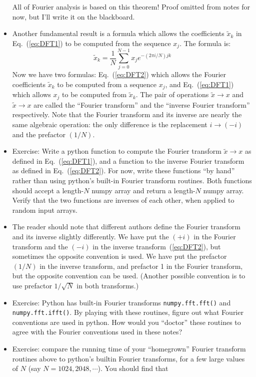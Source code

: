 \documentclass[aps,prd,superscriptaddress,groupedaddress,nofootinbib,nobibnotes]{revtex4}
\newcommand{\be}{\begin{equation}}
\newcommand{\ee}{\end{equation}}
\def\tx{{\tilde x}}
\begin{document}
\begin{itemize}
 All of Fourier analysis is based on this theorem!  Proof omitted from notes for now, but I'll
 write it on the blackboard.
\item Another fundamental result is a formula which allows the coefficients $\tx_k$ in Eq.~(\ref{eq:DFT1})
 to be computed from the sequence $x_j$.  The formula is:
\be
  \tx_k = \frac{1}{N} \sum_{j=0}^{N-1} x_j e^{-(2\pi i / N) j k}  \label{eq:DFT2}
\ee
 Now we have two formulas: Eq.~(\ref{eq:DFT2}) which allows the Fourier coefficients $\tx_k$ to be
 computed from a sequence $x_j$, and Eq.~(\ref{eq:DFT1}) which allows $x_j$ to be computed from $\tx_k$.
 The pair of operations $\tx \rightarrow x$ and $\tx \rightarrow x$ are called the ``Fourier transform''
 and the ``inverse Fourier transform'' respectively.
 Note that the Fourier transform and its inverse are nearly the same algebraic operation: 
 the only difference is the replacement $i \rightarrow (-i)$ and the prefactor $(1/N)$.
\item Exercise: Write a python function to compute the Fourier transform $\tx \rightarrow x$ as defined in Eq.~(\ref{eq:DFT1}),
 and a function to the inverse Fourier transform as defined in Eq.~(\ref{eq:DFT2}).  For now, write these functions
 ``by hand'' rather than using python's built-in Fourier transform routines.  Both functions should accept
 a length-$N$ numpy array and return a length-$N$ numpy array.  Verify that the two functions are inverses of each
 other, when applied to random input arrays.
\item The reader should note that different authors define the Fourier transform and its inverse slightly differently.
 We have put the $(+i)$ in the Fourier transform and the $(-i)$ in the inverse transform~(\ref{eq:DFT2}),
 but sometimes the opposite convention is used.  We have put the prefactor $(1/N)$ in the inverse transform,
 and prefactor 1 in the Fourier transform, but the opposite convention can be used.  (Another possible convention is
 to use prefactor $1/\sqrt{N}$ in both transforms.)
\item Exercise: Python has built-in Fourier transforms {\tt numpy.fft.fft()} and {\tt numpy.fft.ifft()}.
 By playing with these routines, figure out what Fourier conventions are used in python.
 How would you ``doctor'' these routines to agree with the Fourier conventions used in these notes?
\item Exercise: compare the running time of your ``homegrown'' Fourier transform routines above to python's
 builtin Fourier transforms, for a few large values of $N$ (say $N=1024, 2048, \cdots$).  You should find that

\end{itemize}
\end{document}
